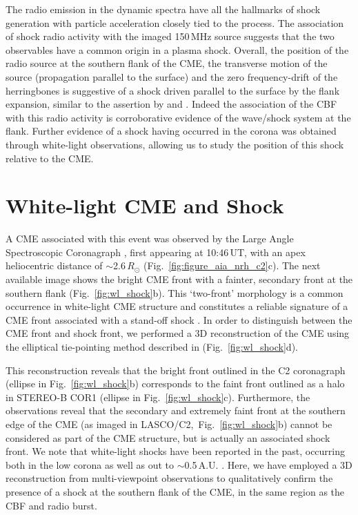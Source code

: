 The radio emission in the dynamic spectra have all the hallmarks of shock generation with particle acceleration closely tied to the process. The association of shock radio activity with the imaged 150\,MHz source suggests that the two observables have a common origin in a plasma shock. Overall, the position of the radio source at the southern flank of the CME, the transverse motion of the source (propagation parallel to the surface) and the zero frequency-drift of the herringbones is suggestive of a shock driven parallel to the surface by the flank expansion, similar to the assertion by \cite{stewart1980} and \cite{schmidt2012}. Indeed the association of the CBF with this radio activity is corroborative evidence of the wave/shock system at the flank. Further evidence of a shock having occurred in the corona was obtained through white-light observations, allowing us to study the position of this shock relative to the CME.

\section{White-light CME and Shock}

A CME associated with this event was observed by the Large Angle Spectroscopic Coronagraph \citep[LASCO;][]{bru95}, first appearing at 10:46\,UT, with an apex heliocentric distance of $\sim$2.6\,$R_{\odot}$ (Fig.~\ref{fig:figure_aia_nrh_c2}c). The next available image shows the bright CME front with a fainter, secondary front at the southern flank (Fig.~\ref{fig:wl_shock}b). This `two-front' morphology is a common occurrence in white-light CME structure and constitutes a reliable signature of a CME front associated with a stand-off shock \citep{vourlidas2012}. In order to distinguish between the CME front and shock front, we performed a 3D reconstruction of the CME using the elliptical tie-pointing method described in \cite{byrne2010} (Fig.~\ref{fig:wl_shock}d). 

This reconstruction reveals that the bright front outlined in the C2 coronagraph (ellipse in Fig.~\ref{fig:wl_shock}b) corresponds to the faint front outlined as a halo in STEREO-B COR1 (ellipse in Fig.~\ref{fig:wl_shock}c). 
Furthermore, the observations reveal that the secondary and extremely faint front at the southern edge of the CME (as imaged in LASCO/C2,~Fig.~\ref{fig:wl_shock}b) cannot be considered as part of the CME structure, but is actually an associated shock front. We note that white-light shocks have been reported in the past, occurring both in the low corona as well as out to $\sim$0.5\,A.U. \citep{vourlidas2012, maloney2011}. Here, we have employed a 3D reconstruction from multi-viewpoint observations to qualitatively confirm the presence of a shock at the southern flank of the CME, in the same region as the CBF and radio burst.

